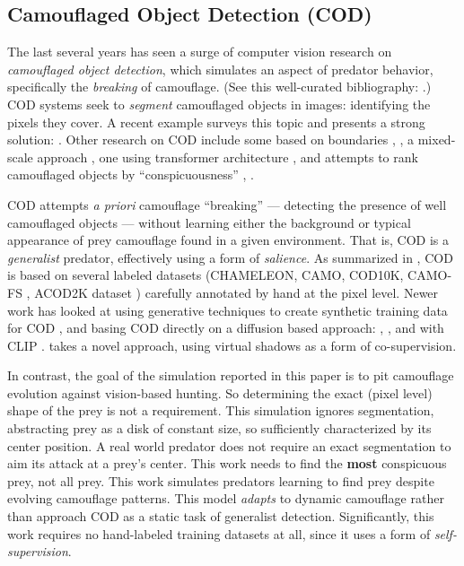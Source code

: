 \documentclass[letterpaper]{article}
\newcommand{\jargon}[1]{\textit{#1}}
\begin{document}
\subsection{Camouflaged Object Detection (COD)}
The last several years has seen a surge of computer vision research on \jargon{camouflaged object detection}, which simulates an aspect of predator behavior, specifically the \textit{breaking} of camouflage. (See this well-curated bibliography: \citet{visionxiang_cod}.) COD systems seek to \jargon{segment} camouflaged objects in images: identifying the pixels they cover. A recent example surveys this topic and presents a strong solution: \citet{Zhang2022}. Other research on COD include some based on boundaries \citep{chen_boundary-guided_2022}, \citep{sun_boundary-guided_2022}, a mixed-scale approach \citep{pang_zoom_2022}, one using transformer architecture \citep{yin_camoformer_2022}, and attempts to rank camouflaged objects by ``conspicuousness'' \citep{lv_cod_2022}, \citep{volonakis_camouflage_2018}.
\par
COD attempts \textit{a priori} camouflage ``breaking'' --- detecting the presence of well camouflaged objects --- without learning either the background or typical appearance of prey camouflage found in a given environment. That is, COD is a \jargon{generalist} predator, effectively using a form of \jargon{salience}. As summarized in \citet{Zhang2022}, COD is based on several labeled datasets (CHAMELEON, CAMO, COD10K, CAMO-FS \citep{nguyen_few-shot_2023}, ACOD2K dataset \citep{song_camouflaged_2023}) carefully annotated by hand at the pixel level. Newer work has looked at using generative techniques to create synthetic training data for COD \citep{zhang_camouflaged_2023}, and basing COD directly on a diffusion based approach: \citep{chen_diffusion_2023}, \citep{chen_camodiffusion_2023}, and with CLIP \citep{vu_leveraging_2023}. \citet{hu_shifting_2024} takes a novel approach, using virtual shadows as a form of co-supervision.
\par
In contrast, the goal of the simulation reported in this paper is to pit camouflage evolution against vision-based hunting. So determining the exact (pixel level) shape of the prey is not a requirement. This simulation ignores segmentation, abstracting prey as a disk of constant size, so sufficiently characterized by its center position. A real world predator does not require an exact segmentation to aim its attack at a prey's center. This work needs to find the \textbf{most} conspicuous prey, not all prey. This work simulates predators learning to find prey despite evolving camouflage patterns. This model \jargon{adapts} to dynamic camouflage rather than approach COD as a static task of generalist detection. Significantly, this work requires no hand-labeled training datasets at all, since it uses a form of \jargon{self-supervision}.
\par
\end{document}
